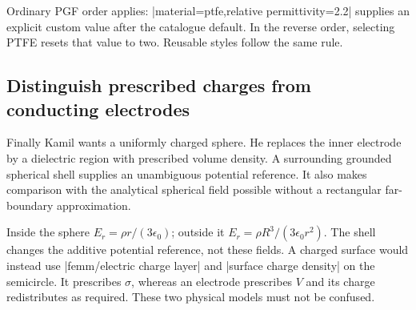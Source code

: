 Ordinary PGF order applies: |material=ptfe,relative permittivity=2.2| supplies
an explicit custom value after the catalogue default. In the reverse order,
selecting PTFE resets that value to two. Reusable styles follow the same rule.

\subsection{Distinguish prescribed charges from conducting electrodes}
Finally Kamil wants a uniformly charged sphere. He replaces the inner
electrode by a dielectric region with prescribed volume density. A surrounding
grounded spherical shell supplies an unambiguous potential reference. It also
makes comparison with the analytical spherical field possible without a
rectangular far-boundary approximation.

\begin{codeexample}[width=0pt]
\end{codeexample}

Inside the sphere $E_r=\rho r/(3\epsilon_0)$; outside it
$E_r=\rho R^3/(3\epsilon_0r^2)$. The shell changes the additive potential
reference, not these fields. A charged surface would instead use
|femm/electric charge layer| and |surface charge density| on the semicircle.
It prescribes $\sigma$, whereas an electrode prescribes $V$ and its charge
redistributes as required. These two physical models must not be confused.

